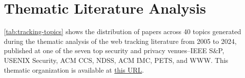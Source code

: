 \section{Thematic Literature Analysis}
\label{sec:thematic-analysis}

\autoref{tab:tracking-topics} shows the distribution of papers across 40 topics generated during the thematic analysis of the web tracking literature from 2005 to 2024, published at one of the seven top security and privacy venues--IEEE S\&P, USENIX Security, ACM CCS, NDSS, ACM IMC, PETS, and WWW. This thematic organization is available at \href{https://osf.io/zsy7e/overview?view_only=a346b98bf89244b5b17d842f6fb3fb13}{this URL}.

\begin{table}
\centering
\small
\renewcommand{\arraystretch}{1.15}


\end{table}
